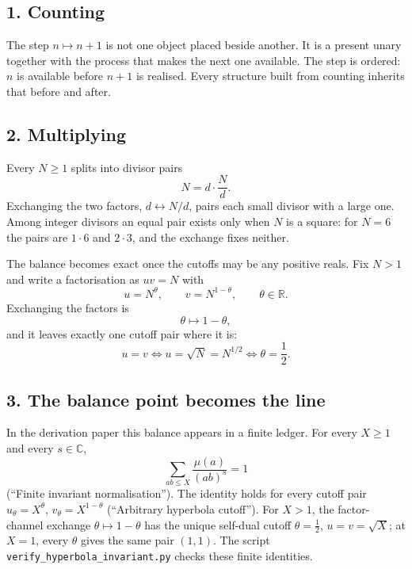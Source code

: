 \documentclass[11pt]{article}
\begin{document}
\subsection*{1. Counting}

The step \(n\mapsto n+1\) is not one object placed beside another. It is a present unary together with the process that makes the next one available. The step is ordered: \(n\) is available before \(n+1\) is realised. Every structure built from counting inherits that before and after.

\subsection*{2. Multiplying}

Every \(N\ge1\) splits into divisor pairs
\[
N=d\cdot\frac Nd.
\]
Exchanging the two factors, \(d\leftrightarrow N/d\), pairs each small divisor with a large one. Among integer divisors an equal pair exists only when \(N\) is a square: for \(N=6\) the pairs are \(1\cdot6\) and \(2\cdot3\), and the exchange fixes neither.

The balance becomes exact once the cutoffs may be any positive reals. Fix \(N>1\) and write a factorisation as \(uv=N\) with
\[
u=N^\theta,
\qquad
v=N^{1-\theta},
\qquad
\theta\in\mathbb R.
\]
Exchanging the factors is
\[
\theta\longmapsto1-\theta,
\]
and it leaves exactly one cutoff pair where it is:
\[
u=v
\iff
u=\sqrt N=N^{1/2}
\iff
\theta=\frac12.
\]

\subsection*{3. The balance point becomes the line}

In the derivation paper this balance appears in a finite ledger. For every \(X\ge1\) and every \(s\in\mathbb C\),
\[
\sum_{ab\le X}\frac{\mu(a)}{(ab)^s}=1
\]
(``Finite invariant normalisation''). The identity holds for every cutoff pair \(u_\theta=X^\theta\), \(v_\theta=X^{1-\theta}\) (``Arbitrary hyperbola cutoff''). For \(X>1\), the factor-channel exchange \(\theta\mapsto1-\theta\) has the unique self-dual cutoff \(\theta=\tfrac12\), \(u=v=\sqrt X\); at \(X=1\), every \(\theta\) gives the same pair \((1,1)\). The script \texttt{verify\_\allowbreak hyperbola\_\allowbreak invariant.py} checks these finite identities.
\end{document}
